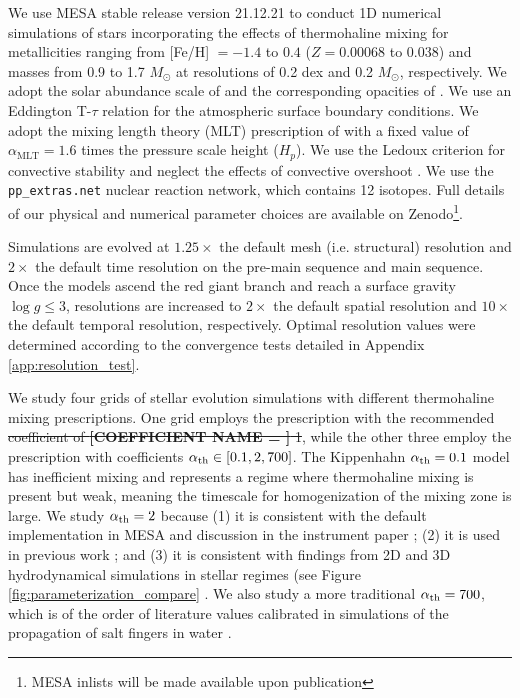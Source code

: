 %
%
%
We use MESA stable release version 21.12.21 to conduct 1D numerical simulations of stars incorporating the effects of thermohaline mixing for metallicities ranging from [Fe/H] $= -1.4$ to $0.4$ ($Z = 0.00068$ to $0.038$) and masses from 0.9 to 1.7 $M_{\odot}$ at resolutions of 0.2 dex and 0.2 $M_{\odot}$, respectively. We adopt the solar abundance scale of \citet{GrevesseSauval1998} and the corresponding opacities of \citet{IglesiasRogers1996}. We use an Eddington T-$\tau$ relation for the atmospheric surface boundary conditions.
We adopt the mixing length theory (MLT) prescription of \citet{Cox1980} with a fixed value of $\alpha_{\text{MLT}}= 1.6$ times the pressure scale height ($H_p$). We use the Ledoux criterion for convective stability and neglect the effects of convective overshoot \citep{Ledoux1947}. We use the \verb|pp_extras.net| nuclear reaction network, which contains 12 isotopes. Full details of our physical and numerical parameter choices are available on Zenodo\footnote{MESA inlists will be made available upon publication}. 

Simulations are evolved at $1.25\times$ the default mesh (i.e. structural) resolution and $2\times$ the default time resolution on the pre-main sequence and main sequence. Once the models ascend the red giant branch and reach a surface gravity $\log g \le 3$, resolutions are increased to $2\times$ the default spatial resolution and $10\times$ the default temporal resolution, respectively. Optimal resolution values were determined according to the convergence tests detailed in Appendix \ref{app:resolution_test}. 

We study four grids of stellar evolution simulations with different thermohaline mixing prescriptions. One grid employs the \citet{brown_etal_2013} prescription with the recommended \sout{coefficient of \textbf{[COEFFICIENT NAME = ]} 1}, while the other three employ the \citet{kippenhahn_etal_1980} prescription with coefficients $\alpha_{\rm th} \in [0.1, 2, 700]$. 
The Kippenhahn $\alpha_{\rm th} = 0.1$ model has inefficient mixing and represents a regime where thermohaline mixing is present but weak, meaning the timescale for homogenization of the mixing zone is large.
%
%
We study $\alpha_{\rm th} = 2$ because (1) it is consistent with the default implementation in MESA and discussion in the instrument paper \citep{paxton2013}; (2) it is used in previous work \citep{CantielloLanger2010, TayarJoyce22}; and (3) it is consistent with findings from 2D and 3D hydrodynamical simulations in stellar regimes (see Figure \ref{fig:parameterization_compare} \citep{Denissenkov2010, Traxler2011, brown_etal_2013}. We also study a more traditional $\alpha_{\rm th} = 700$, which is of the order of literature values calibrated in simulations of the propagation of salt fingers in water \citep{lattanzio_etal_2015, charbonnel_thermohaline_2007}.

